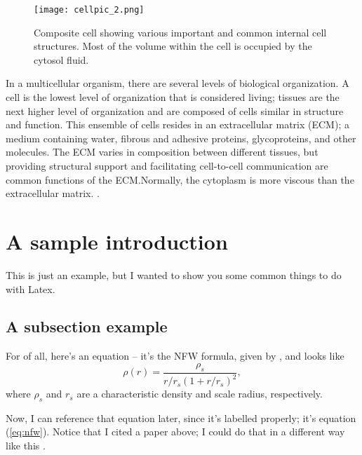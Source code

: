 \begin{figure}[h]
	\centering
	\texttt{[image: cellpic\_2.png]}
	\caption{Composite cell showing various important and common internal cell structures. Most of the volume within the cell is occupied by the cytosol fluid.}
	\label{fig:group2_object2_side2_pulses13(edited)}
\end{figure}


In a multicellular organism, there are several levels of biological organization. A cell is the lowest level of organization that is considered living; tissues are the next higher level of organization and are composed of cells similar in structure and function. This ensemble of cells resides in an extracellular matrix (ECM); a medium containing water, fibrous and adhesive proteins, glycoproteins, and other molecules. The ECM varies in composition between different tissues, but providing structural support and facilitating cell-to-cell communication are common functions of the ECM.Normally, the cytoplasm is more viscous than the extracellular matrix. \citep{cr-biology}.






















\section{A sample introduction}

This is just an example, but I wanted to show you some common things to do with Latex.

\subsection{A subsection example}

For of all, here's an equation -- it's the NFW formula, given by \citet{nfw95}, and looks like
\begin{equation}
	\label{eq:nfw}
	\rho(r) = \frac{\rho_s}{r / r_s (1 + r / r_s)^2},
\end{equation}
where $\rho_s$ and $r_s$ are a characteristic density and scale radius, respectively.

Now, I can reference that equation later, since it's labelled properly; it's equation (\ref{eq:nfw}).  Notice that I cited a paper above; I could do that in a different way like this \citep{nfw95}.

